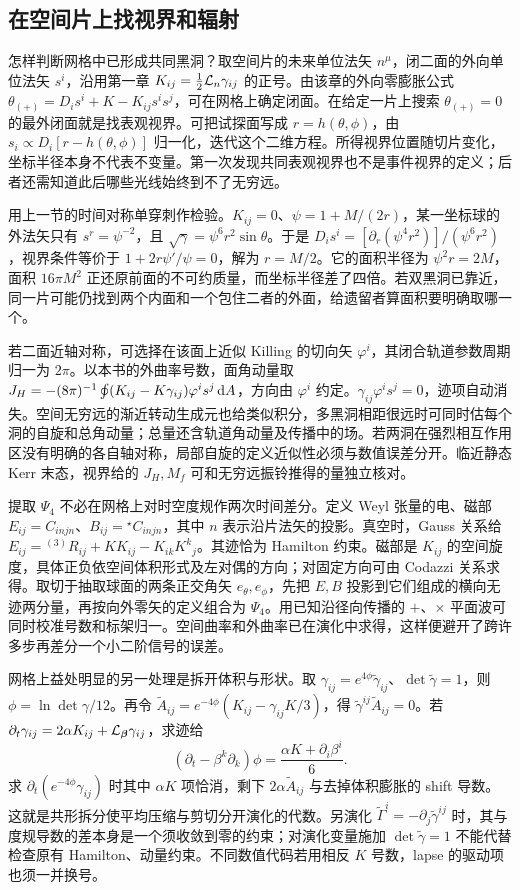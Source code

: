 \subsection{在空间片上找视界和辐射}

怎样判断网格中已形成共同黑洞？取空间片的未来单位法矢 $n^\mu$，闭二面的外向单位法矢 $s^i$，沿用第一章 $K_{ij}=\tfrac12{\cal L}_n\gamma_{ij}$ 的正号。由该章的外向零膨胀公式 $\theta_{(+)}=D_i s^i+K-K_{ij}s^i s^j$，可在网格上确定闭面。在给定一片上搜索 $\theta_{(+)}=0$ 的最外闭面就是找表观视界。可把试探面写成 $r=h(\theta,\phi)$，由 $s_i\propto D_i[r-h(\theta,\phi)]$ 归一化，迭代这个二维方程。所得视界位置随切片变化，坐标半径本身不代表不变量。第一次发现共同表观视界也不是事件视界的定义；后者还需知道此后哪些光线始终到不了无穷远。

用上一节的时间对称单穿刺作检验。$K_{ij}=0$、$\psi=1+M/(2r)$，某一坐标球的外法矢只有 $s^r=\psi^{-2}$，且 $\sqrt\gamma=\psi^6 r^2\sin\theta$。于是 $D_i s^i=[\partial_r(\psi^4 r^2)]/(\psi^6 r^2)$，视界条件等价于 $1+2r\psi'/\psi=0$，解为 $r=M/2$。它的面积半径为 $\psi^2 r=2M$，面积 $16\pi M^2$ 正还原前面的不可约质量，而坐标半径差了四倍。若双黑洞已靠近，同一片可能仍找到两个内面和一个包住二者的外面，给遗留者算面积要明确取哪一个。

若二面近轴对称，可选择在该面上近似 Killing 的切向矢 $\varphi^i$，其闭合轨道参数周期归一为 $2\pi$。以本书的外曲率号数，面角动量取 $J_H=-(8\pi)^{-1}\oint (K_{ij}-K\gamma_{ij})\varphi^i s^j\,\dd A$，方向由 $\varphi^i$ 约定。$\gamma_{ij}\varphi^i s^j=0$，迹项自动消失。空间无穷远的渐近转动生成元也给类似积分，多黑洞相距很远时可同时估每个洞的自旋和总角动量；总量还含轨道角动量及传播中的场。若两洞在强烈相互作用区没有明确的各自轴对称，局部自旋的定义近似性必须与数值误差分开。临近静态 Kerr 末态，视界给的 $J_H,M_f$ 可和无穷远振铃推得的量独立核对。

提取 $\Psi_4$ 不必在网格上对时空度规作两次时间差分。定义 Weyl 张量的电、磁部 $E_{ij}=C_{i n j n}$、$B_{ij}={}^\star C_{i n j n}$，其中 $n$ 表示沿片法矢的投影。真空时，Gauss 关系给 $E_{ij}={}^{(3)}R_{ij}+K K_{ij}-K_{ik}K^k{}_j$。其迹恰为 Hamilton 约束。磁部是 $K_{ij}$ 的空间旋度，具体正负依空间体积形式及左对偶的方向；对固定方向可由 Codazzi 关系求得。取切于抽取球面的两条正交角矢 $e_\theta,e_\phi$，先把 $E,B$ 投影到它们组成的横向无迹两分量，再按向外零矢的定义组合为 $\Psi_4$。用已知沿径向传播的 $+$、$\times$ 平面波可同时校准号数和标架归一。空间曲率和外曲率已在演化中求得，这样便避开了跨许多步再差分一个小二阶信号的误差。

网格上益处明显的另一处理是拆开体积与形状。取 $\gamma_{ij}=e^{4\phi}\tilde\gamma_{ij}$、$\det\tilde\gamma=1$，则 $\phi=\ln\det\gamma/12$。再令 $\tilde A_{ij}=e^{-4\phi}(K_{ij}-\gamma_{ij}K/3)$，得 $\tilde\gamma^{ij}\tilde A_{ij}=0$。若 $\partial_t\gamma_{ij}=2\alpha K_{ij}+{\cal L}_{\bm\beta}\gamma_{ij}$，求迹给
\[
 (\partial_t-\beta^k\partial_k)\phi
       =\frac{\alpha K+\partial_i\beta^i}{6}.
\]
求 $\partial_t(e^{-4\phi}\gamma_{ij})$ 时其中 $\alpha K$ 项恰消，剩下 $2\alpha\tilde A_{ij}$ 与去掉体积膨胀的 shift 导数。这就是共形拆分使平均压缩与剪切分开演化的代数。另演化 $\tilde\Gamma^i=-\partial_j\tilde\gamma^{ij}$ 时，其与度规导数的差本身是一个须收敛到零的约束；对演化变量施加 $\det\tilde\gamma=1$ 不能代替检查原有 Hamilton、动量约束。不同数值代码若用相反 $K$ 号数，lapse 的驱动项也须一并换号。

